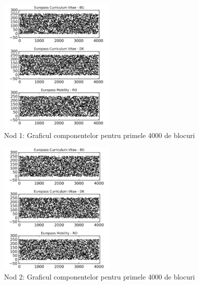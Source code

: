 \documentclass[oneside, 12pt]{book}
\begin{document}
\begin{figure}[b!]
\begin{center}
\includegraphics[width=0.5\textwidth]{img/db1_c.png}    %
\caption{Nod 1: Graficul componentelor pentru primele 4000 de blocuri} 
\label{fig:db1_c}
\end{center}
\end{figure}

\begin{figure}[t!]
\begin{center}
\includegraphics[width=0.5\textwidth]{img/db2_c.png}    %
\caption{Nod 2: Graficul componentelor pentru primele 4000 de blocuri} 
\label{fig:db2_c}
\end{center}
\end{figure}
\end{document}
